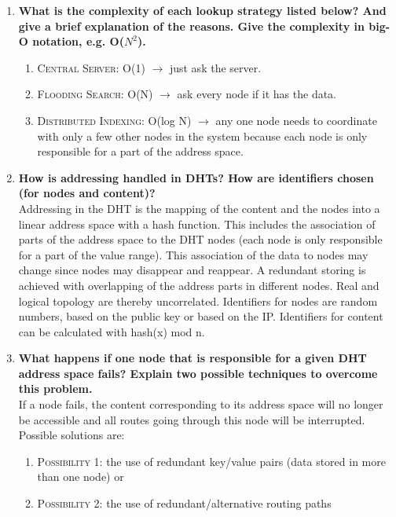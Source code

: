 \documentclass{article}
\begin{document}
\begin{enumerate}[1]
\item \textbf{What is the complexity of each lookup strategy listed below? And give a brief explanation of the reasons. Give the complexity in big-O notation, e.g. O($N^{2}$).} 
\begin{enumerate}[]
	\item\textsc{Central Server}: O(1) $\rightarrow$ just ask the server.
	\item\textsc{Flooding Search}: O(N) $\rightarrow$ ask every node if it has the data.
	\item\textsc{Distributed Indexing}: O(log N) $\rightarrow$ any one node needs to coordinate with only a few other nodes in the system because each node is only responsible for a part of the address space.\\
\end{enumerate}

\item \textbf{How is addressing handled in DHTs? How are identifiers chosen (for nodes and content)?} \\ 
Addressing in the DHT is the mapping of the content and the nodes into a linear address space with a hash function. This includes the association of parts of the address space to the DHT nodes (each node is only responsible for a part of the value range). This association of the data to nodes may change since nodes may disappear and reappear. A redundant storing is achieved with overlapping of the address parts in different nodes. Real and logical topology are thereby uncorrelated. Identifiers for nodes are random numbers, based on the public key or based on the IP. Identifiers for content can be calculated with hash(x) mod n.\\ 

\item \textbf{What happens if one node that is responsible for a given DHT address space fails? Explain two possible techniques to overcome this problem.} \\ If a node fails, the content corresponding to its address space will no longer be accessible and all routes going through this node will be interrupted. Possible solutions are:
\begin{enumerate}[]
	\item\textsc{Possibility 1}: the use of redundant key/value pairs (data stored in more than one node) or
	\item\textsc{Possibility 2}: the use of redundant/alternative routing paths \\
\end{enumerate} 


\end{enumerate}
\end{document}
